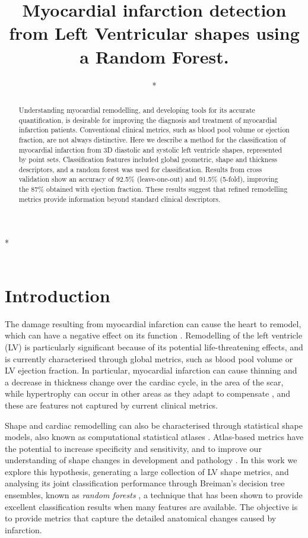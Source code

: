 \documentclass{llncs}
\begin{document}
\title{Myocardial infarction detection from Left Ventricular shapes using a Random Forest.}

\author{*}

\institute
{*\\
\email{*}\\
}
\maketitle              %
\begin{abstract}
Understanding myocardial remodelling, and developing tools for its accurate quantification, is desirable for improving the diagnosis and treatment of myocardial infarction patients. Conventional clinical metrics, such as blood pool volume or ejection fraction, are not always distinctive. Here we describe a method for the classification of myocardial infarction from 3D diastolic and systolic left ventricle shapes, represented by point sets. Classification features included global geometric, shape and thickness descriptors, and a random forest was used for classification. Results from cross validation show an accuracy of 92.5\% (leave-one-out) and 91.5\% (5-fold), improving the 87\% obtained with ejection fraction. These results suggest that refined remodelling metrics provide information beyond standard clinical descriptors.

\end{abstract}
%
\section{Introduction}
The damage resulting from myocardial infarction can cause the heart to remodel, which can have a negative effect on its function \cite{Sutton2000}. Remodelling of the left ventricle (LV) is particularly significant because of its potential life-threatening effects, and is currently characterised through global metrics, such as blood pool volume or LV ejection fraction. In particular, myocardial infarction can cause thinning and a decrease in thickness change over the cardiac cycle, in the area of the scar, while hypertrophy can occur in other areas as they adapt to compensate \cite{Sutton2000}, and these are features not captured by current clinical metrics. 

 

Shape and cardiac remodelling can also be characterised through statistical shape models, also known as computational statistical atlases \cite{Cootes1992,Young2009}. Atlas-based metrics have the potential to increase  specificity and sensitivity, and to improve our understanding of shape changes in development and pathology \cite{Lewandowski2012,Lorenz2006}. In this work we explore this hypothesis, generating a large collection of LV shape metrics, and analysing its joint classification performance through Breiman's decision tree ensembles, known as \emph{random forests} \cite{Breiman2001}, a technique that has been shown to provide excellent classification results when many features are available. The objective is to provide metrics that capture the detailed anatomical changes caused by infarction.
\end{document}
